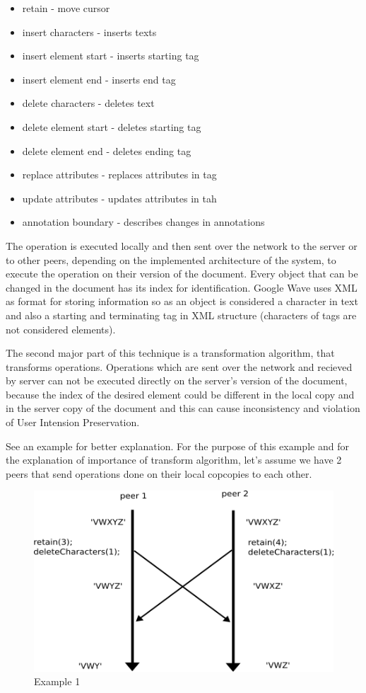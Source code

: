 \documentclass[12pt,oneside]{fithesis2}
\begin{document}
\begin{itemize}
\item retain - move cursor
\item insert characters - inserts texts
\item insert element start - inserts starting tag
\item insert element end - inserts end tag
\item delete characters - deletes text
\item delete element start - deletes starting tag
\item delete element end - deletes ending tag
\item replace attributes - replaces attributes in tag
\item update attributes - updates attributes in tah
\item annotation boundary - describes changes in annotations
\end{itemize}
\par The operation is executed locally and then sent over the network to the server or to other peers, depending on the implemented architecture of the system, to execute the operation on their version of the document. Every object that can be changed in the document has its index for identification. Google Wave uses XML as format for storing information so as an object is considered a character in text and also a starting and terminating tag in XML structure (characters of tags are not considered elements). 
\par The second major part of this technique is a transformation algorithm, that transforms operations. Operations which are sent over the network and recieved by server can not be executed directly on the server's version of the document, because the index of the desired element could be different in the local copy and in the server copy of the document and this can cause inconsistency and violation of User Intension Preservation. 
\par See an example for better explanation. For the purpose of this example and for the explanation of importance of transform algorithm, let's assume we have 2 peers that send operations done on their local copcopies to each other. 
\begin{figure}[H]
\caption{Example 1}
\centering
\includegraphics{example}
\end{figure}
\end{document}
